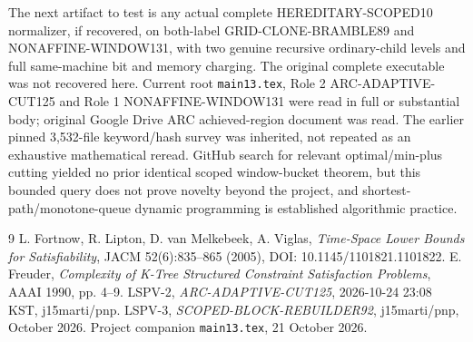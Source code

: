 \documentclass[11pt]{article}
\begin{document}
The next artifact to test is any actual complete HEREDITARY-SCOPED10 normalizer, if recovered, on both-label GRID-CLONE-BRAMBLE89 and NONAFFINE-WINDOW131, with two genuine recursive ordinary-child levels and full same-machine bit and memory charging. The original complete executable was not recovered here. Current root \texttt{main13.tex}, Role 2 ARC-ADAPTIVE-CUT125 and Role 1 NONAFFINE-WINDOW131 were read in full or substantial body; original Google Drive ARC achieved-region document was read. The earlier pinned 3,532-file keyword/hash survey was inherited, not repeated as an exhaustive mathematical reread. GitHub search for relevant optimal/min-plus cutting yielded no prior identical scoped window-bucket theorem, but this bounded query does not prove novelty beyond the project, and shortest-path/monotone-queue dynamic programming is established algorithmic practice.

\begin{thebibliography}{9}
 L. Fortnow, R. Lipton, D. van Melkebeek, A. Viglas, \emph{Time-Space Lower Bounds for Satisfiability}, JACM 52(6):835--865 (2005), DOI: 10.1145/1101821.1101822.
 E. Freuder, \emph{Complexity of K-Tree Structured Constraint Satisfaction Problems}, AAAI 1990, pp. 4--9.
 LSPV-2, \emph{ARC-ADAPTIVE-CUT125}, 2026-10-24 23:08 KST, j15marti/pnp.
 LSPV-3, \emph{SCOPED-BLOCK-REBUILDER92}, j15marti/pnp, October 2026.
 Project companion \texttt{main13.tex}, 21 October 2026.
\end{thebibliography}
\end{document}

